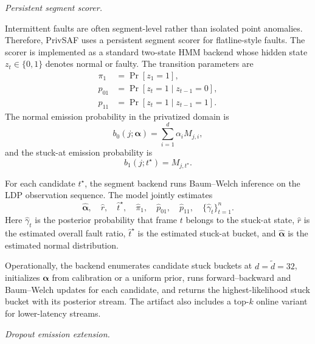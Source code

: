 \documentclass[conference]{IEEEtran}
\begin{document}
\noindent\emph{Persistent segment scorer.}
\label{sec:hmm}

Intermittent faults are often segment-level rather than isolated point anomalies. Therefore, PrivSAF uses a persistent segment scorer for flatline-style faults. The scorer is implemented as a standard two-state HMM backend whose hidden state \(z_t\in\{0,1\}\) denotes normal or faulty. The transition parameters are
\[
\begin{aligned}
\pi_1&=\Pr[z_1=1],\\
p_{01}&=\Pr[z_t=1\mid z_{t-1}=0],\\
p_{11}&=\Pr[z_t=1\mid z_{t-1}=1].
\end{aligned}
\]
The normal emission probability in the privatized domain is
\begin{equation}
b_0(j;\boldsymbol{\alpha})
=
\sum_{i=1}^{d}\alpha_iM_{j,i},
\label{eq:hmm-normal-emission}
\end{equation}
and the stuck-at emission probability is
\begin{equation}
b_1(j;t^\star)=M_{j,t^\star}.
\label{eq:hmm-fault-emission}
\end{equation}

For each candidate \(t^\star\), the segment backend runs Baum--Welch inference on the LDP observation sequence. The model jointly estimates
\[
\hat{\boldsymbol{\alpha}},
\quad
\hat r,
\quad
\hat t^\star,
\quad
\hat\pi_1,
\quad
\hat p_{01},
\quad
\hat p_{11},
\quad
\{\hat\gamma_t\}_{t=1}^{n}.
\]
Here \(\hat\gamma_t\) is the posterior probability that frame \(t\) belongs to the stuck-at state, \(\hat r\) is the estimated overall fault ratio, \(\hat t^\star\) is the estimated stuck-at bucket, and \(\hat{\boldsymbol{\alpha}}\) is the estimated normal distribution.

Operationally, the backend enumerates candidate stuck buckets at \(d=\tilde d=32\), initializes \(\boldsymbol{\alpha}\) from calibration or a uniform prior, runs forward--backward and Baum--Welch updates for each candidate, and returns the highest-likelihood stuck bucket with its posterior stream. The artifact also includes a top-\(k\) online variant for lower-latency streams.

\noindent\emph{Dropout emission extension.}
\label{sec:dropout_model}
\end{document}
